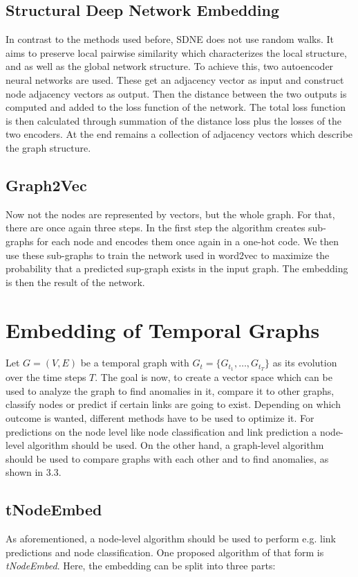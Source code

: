 \documentclass[sigconf]{acmart}
\begin{document}
\subsection{Structural Deep Network Embedding}
In contrast to the methods used before, SDNE does not use random walks. It aims to preserve local pairwise similarity which characterizes the local structure, and 
as well as the global network structure.
To achieve this, two autoencoder neural networks are used. These get an adjacency vector as input and construct node adjacency vectors as output.
Then the distance between the two outputs is computed and added to the loss function of the network.
The total loss function is then calculated through summation of the distance loss plus the losses of the two encoders.
At the end remains a collection of adjacency vectors which describe the graph structure.
\cite{Godec.31.12.2018}


\subsection{Graph2Vec}
Now not the nodes are represented by vectors, but the whole graph. For that, there are once again three steps. 
In the first step the algorithm creates sub-graphs for each node and encodes them once again in a one-hot code. We then use these sub-graphs to train the network used in 
word2vec to maximize the probability that a predicted sup-graph exists in the input graph. The embedding is then the result of the network.
\cite{Godec.31.12.2018}



\section{Embedding of Temporal Graphs}
Let \(G = (V,E)\) be a temporal graph with \(G_t=\{G_{t_1}, \ldots,G_{t_T}\} \) as its evolution over the time steps \(T\).
The goal is now, to create a vector space which can be used to analyze the graph to find anomalies in it, compare it to other graphs, classify nodes or predict if 
certain links are going to exist.
Depending on which outcome is wanted, different methods have to be used to optimize it. For predictions on the node level like node classification and link prediction a node-level algorithm should be used. 
On the other hand, a graph-level algorithm should be used to compare graphs with each other and to find anomalies, as shown in 3.3.

\subsection{tNodeEmbed}
As aforementioned, a node-level algorithm should be used to perform e.g. link predictions and node classification. 
One proposed algorithm of that form is \emph{tNodeEmbed}. Here, the embedding can be split into three parts: 
\end{document}
